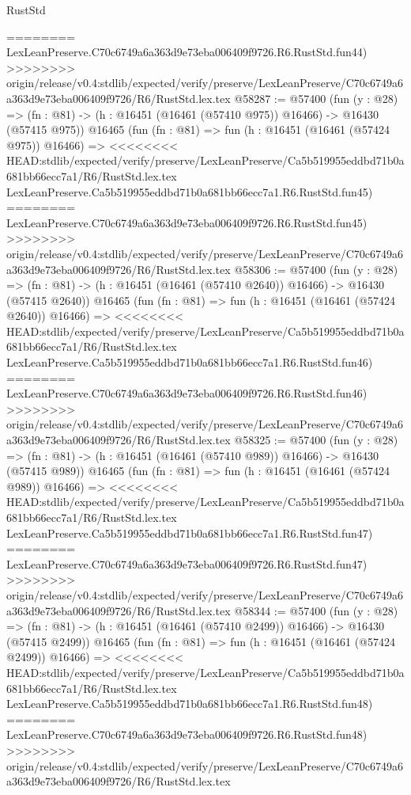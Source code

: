 \begin{lexlean}{RustStd}
\begin{coremodule}
{\begin{coremodule}
{{{{{{{{{{{{{{{{{{{{{{{{{{{{{{{{{{{{{{{{{{{{{{{{{{{{{{{========
    LexLeanPreserve.C70c6749a6a363d9e73eba006409f9726.R6.RustStd.fun44)
>>>>>>>> origin/release/v0.4:stdlib/expected/verify/preserve/LexLeanPreserve/C70c6749a6a363d9e73eba006409f9726/R6/RustStd.lex.tex
@58287 := @57400
    (fun (y : @28) =>
    (fn : @81) -> (h : @16451 (@16461 (@57410 @975)) @16466) -> @16430 (@57415 @975))
    @16465
    (fun (fn : @81) =>
    fun (h : @16451 (@16461 (@57424 @975)) @16466) =>
<<<<<<<< HEAD:stdlib/expected/verify/preserve/LexLeanPreserve/Ca5b519955eddbd71b0a681bb66ecc7a1/R6/RustStd.lex.tex
    LexLeanPreserve.Ca5b519955eddbd71b0a681bb66ecc7a1.R6.RustStd.fun45)
========
    LexLeanPreserve.C70c6749a6a363d9e73eba006409f9726.R6.RustStd.fun45)
>>>>>>>> origin/release/v0.4:stdlib/expected/verify/preserve/LexLeanPreserve/C70c6749a6a363d9e73eba006409f9726/R6/RustStd.lex.tex
@58306 := @57400
    (fun (y : @28) =>
    (fn : @81) -> (h : @16451 (@16461 (@57410 @2640)) @16466) -> @16430 (@57415 @2640))
    @16465
    (fun (fn : @81) =>
    fun (h : @16451 (@16461 (@57424 @2640)) @16466) =>
<<<<<<<< HEAD:stdlib/expected/verify/preserve/LexLeanPreserve/Ca5b519955eddbd71b0a681bb66ecc7a1/R6/RustStd.lex.tex
    LexLeanPreserve.Ca5b519955eddbd71b0a681bb66ecc7a1.R6.RustStd.fun46)
========
    LexLeanPreserve.C70c6749a6a363d9e73eba006409f9726.R6.RustStd.fun46)
>>>>>>>> origin/release/v0.4:stdlib/expected/verify/preserve/LexLeanPreserve/C70c6749a6a363d9e73eba006409f9726/R6/RustStd.lex.tex
@58325 := @57400
    (fun (y : @28) =>
    (fn : @81) -> (h : @16451 (@16461 (@57410 @989)) @16466) -> @16430 (@57415 @989))
    @16465
    (fun (fn : @81) =>
    fun (h : @16451 (@16461 (@57424 @989)) @16466) =>
<<<<<<<< HEAD:stdlib/expected/verify/preserve/LexLeanPreserve/Ca5b519955eddbd71b0a681bb66ecc7a1/R6/RustStd.lex.tex
    LexLeanPreserve.Ca5b519955eddbd71b0a681bb66ecc7a1.R6.RustStd.fun47)
========
    LexLeanPreserve.C70c6749a6a363d9e73eba006409f9726.R6.RustStd.fun47)
>>>>>>>> origin/release/v0.4:stdlib/expected/verify/preserve/LexLeanPreserve/C70c6749a6a363d9e73eba006409f9726/R6/RustStd.lex.tex
@58344 := @57400
    (fun (y : @28) =>
    (fn : @81) -> (h : @16451 (@16461 (@57410 @2499)) @16466) -> @16430 (@57415 @2499))
    @16465
    (fun (fn : @81) =>
    fun (h : @16451 (@16461 (@57424 @2499)) @16466) =>
<<<<<<<< HEAD:stdlib/expected/verify/preserve/LexLeanPreserve/Ca5b519955eddbd71b0a681bb66ecc7a1/R6/RustStd.lex.tex
    LexLeanPreserve.Ca5b519955eddbd71b0a681bb66ecc7a1.R6.RustStd.fun48)
========
    LexLeanPreserve.C70c6749a6a363d9e73eba006409f9726.R6.RustStd.fun48)
>>>>>>>> origin/release/v0.4:stdlib/expected/verify/preserve/LexLeanPreserve/C70c6749a6a363d9e73eba006409f9726/R6/RustStd.lex.tex
}}}}}}}}}}}}}}}}}}}}}}}}}}}}}}}}}}}}}}}}}}}}}}}}}}}}}}}
\end{coremodule}}
\end{coremodule}
\end{lexlean}
